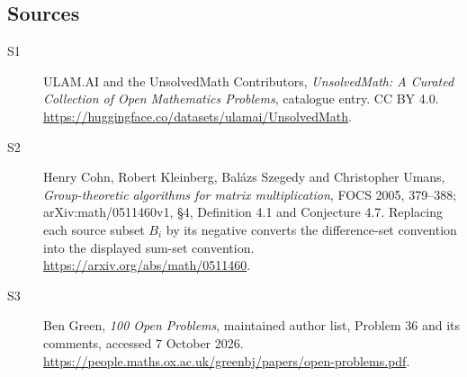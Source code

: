 \documentclass[11pt]{article}
\begin{document}
\subsection{Sources}
\begin{description}
\item[\hypertarget{source:statement:1}{S1}] ULAM.AI and the UnsolvedMath Contributors, \emph{UnsolvedMath: A Curated Collection of Open Mathematics Problems}, catalogue entry. CC BY 4.0. \url{https://huggingface.co/datasets/ulamai/UnsolvedMath}.
\item[\hypertarget{source:statement:2}{S2}] Henry Cohn, Robert Kleinberg, Balázs Szegedy and Christopher Umans, \emph{Group-theoretic algorithms for matrix multiplication}, FOCS 2005, 379--388; arXiv:math/0511460v1, §4, Definition 4.1 and Conjecture 4.7. Replacing each source subset $B_i$ by its negative converts the difference-set convention into the displayed sum-set convention. \url{https://arxiv.org/abs/math/0511460}.
\item[\hypertarget{source:statement:3}{S3}] Ben Green, \emph{100 Open Problems}, maintained author list, Problem 36 and its comments, accessed 7 October 2026. \url{https://people.maths.ox.ac.uk/greenbj/papers/open-problems.pdf}.
\end{description}
\label{end:statement}
\end{document}
